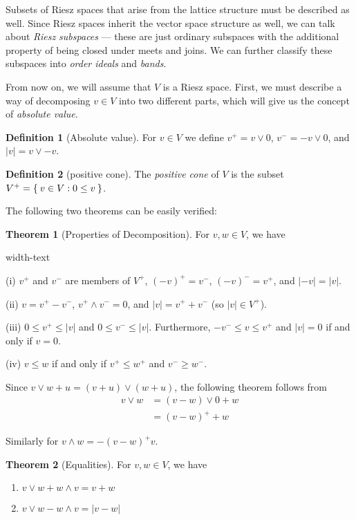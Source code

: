 \documentclass[letterpaper,10pt,oneside,onecolumn,reqno]{amsart}
\theoremstyle{definition}
\newtheorem{thm}{Theorem}
\newtheorem{defn}{Definition}
\newcommand{\meet}{\wedge}
\newcommand{\join}{\vee}
\begin{document}
Subsets of Riesz spaces that arise from the lattice structure must be
described as well. Since Riesz spaces inherit the vector space
structure as well, we can talk about \emph{Riesz subspaces} --- these
are just ordinary subspaces with the additional property of being
closed under meets and joins. We can further classify these subspaces
into \emph{order ideals} and \emph{bands}.

From now on, we will assume that $V$ is a Riesz space. First, we must
describe a way of decomposing $v \in V$ into two different parts,
which will give us the concept of \emph{absolute value}.

\begin{framed}
  \begin{defn}[Absolute value]\label{def:7}
    For $v \in V$ we define $v^+=v \join 0$, $v^-=-v \join 0$, and
    $|v| = v \join -v$.
  \end{defn}

\begin{defn}[positive cone]\label{def:8}
  The \emph{positive cone} of $V$ is the subset
  $V^+ = \Set{v \in V : 0 \leq v}$.
\end{defn}

The following two theorems can be easily verified:

\begin{thm}[Properties of Decomposition]
  \label{thr:1}
  For $v,w \in V$, we have
  \begin{deflist}{width-text}
  \item
  \item[(i)] $v^+$ and $v^-$ are members of $V^+$, ${(-v)}^+=v^-$,
    ${(-v)}^-=v^+$, and $|-v|=|v|$.
  \item[(ii)] $v = v^+ - v^-$, $v^+ \meet v^-=0$, and $|v| = v^++v^-$
    (so $|v| \in V^+$).
  \item[(iii)] $0 \leq v^+ \leq |v|$ and $0 \leq v^- \leq
    |v|$. Furthermore, $-v^- \leq v \leq v^+$ and $|v|=0$ if and only
    if $v=0$.
  \item[(iv)] $v \leq w$ if and only if $v^+ \leq w^+$ and $v^- \geq
    w^-$.
  \end{deflist}
\end{thm}
Since $v \join w + u = (v + u) \join (w + u)$, the following theorem
follows from
\begin{align*}
  v \join w &= (v-w) \join 0 + w \\
  &= {(v-w)}^+ + w
\end{align*}

Similarly for $v \meet w = -{(v-w)}^+ v$.

\begin{thm}[Equalities]\label{thr:2}
  For $v,w \in V$, we have
  \begin{enumerate}
  \item\label{item:1} $v \join w + w \meet v = v + w$
  \item\label{item:2} $v \join w - w \meet v = |v - w|$
  \end{enumerate}
\end{thm}

\end{framed}
\end{document}
